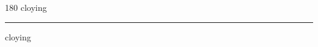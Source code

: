 
\begin{frame}
\begin{center}
\begin{turn}{180}
{\fontsize{2.5cm}{1em}\selectfont cloying}
\end{turn}
\vspace{1em}\par  
\hrule
\vspace{1em}\par  
{\fontsize{2.5cm}{1em}\selectfont cloying}
\end{center}
\end{frame}
